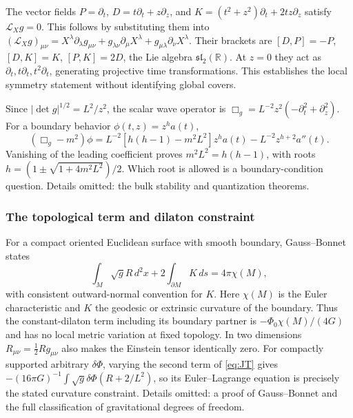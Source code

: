 \documentclass[11pt]{article}
\numberwithin{equation}{section}
\theoremstyle{exposition}
\theoremstyle{result}
\newcommand{\R}{\mathbb R}
\begin{document}
The vector fields $P=\partial_t$, $D=t\partial_t+z\partial_z$, and $K=(t^2+z^2)\partial_t+2tz\partial_z$ satisfy $\mathcal L_Xg=0$. This follows by substituting them into $(\mathcal L_Xg)_{\mu\nu}=X^\lambda\partial_\lambda g_{\mu\nu}+g_{\lambda\nu}\partial_\mu X^\lambda+g_{\mu\lambda}\partial_\nu X^\lambda$. Their brackets are $[D,P]=-P$, $[D,K]=K$, $[P,K]=2D$, the Lie algebra $\mathfrak{sl}_2(\R)$. At $z=0$ they act as $\partial_t,t\partial_t,t^2\partial_t$, generating projective time transformations. This establishes the local symmetry statement without identifying global covers.

Since $|\det g|^{1/2}=L^2/z^2$, the scalar wave operator is $\Box_g=L^{-2}z^2(-\partial_t^2+\partial_z^2)$. For a boundary behavior $\phi(t,z)=z^h a(t)$,
\begin{equation*}
(\Box_g-m^2)\phi
=L^{-2}[h(h-1)-m^2L^2]z^h a(t)-L^{-2}z^{h+2}a''(t).
\end{equation*}
Vanishing of the leading coefficient proves $m^2L^2=h(h-1)$, with roots $h=(1\pm\sqrt{1+4m^2L^2})/2$. Which root is allowed is a boundary-condition question. Details omitted: the bulk stability and quantization theorems.

\subsubsection{The topological term and dilaton constraint}
For a compact oriented Euclidean surface with smooth boundary, Gauss--Bonnet states
\begin{equation*}
\int_M\sqrt g R\,d^2x+2\int_{\partial M}K\,ds=4\pi\chi(M),
\end{equation*}
with consistent outward-normal convention for $K$. Here $\chi(M)$ is the Euler characteristic and $K$ the geodesic or extrinsic curvature of the boundary. Thus the constant-dilaton term including its boundary partner is $-\Phi_0\chi(M)/(4G)$ and has no local metric variation at fixed topology. In two dimensions $R_{\mu\nu}=\tfrac12Rg_{\mu\nu}$ also makes the Einstein tensor identically zero. For compactly supported arbitrary $\delta\Phi$, varying the second term of \eqref{eq:JT} gives $-(16\pi G)^{-1}\int\sqrt g\delta\Phi(R+2/L^2)$, so its Euler--Lagrange equation is precisely the stated curvature constraint. Details omitted: a proof of Gauss--Bonnet and the full classification of gravitational degrees of freedom.
\end{document}
